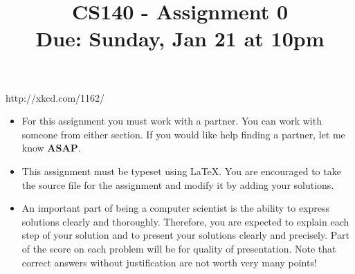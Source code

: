 \documentclass[11pt]{article}
\title{CS140 - Assignment 0\\\small{Due: Sunday,  Jan 21 at 10pm}}
\author{}
\date{}
\begin{document}
\maketitle

\begin{center}

\footnotesize{http://xkcd.com/1162/}
\end{center}


\begin{itemize}
\item For this assignment you must work with a partner.   You can work with someone from either section.  If you would like help finding a partner, let me know \textbf{ASAP}.

\item This assignment must be typeset using \LaTeX.  You are
  encouraged to take the source file for the assignment and modify it by adding your solutions.  
  
\item An important part of being a computer scientist is the ability
  to express solutions clearly and thoroughly.  Therefore, you are
  expected to explain each step of your solution and to present your
  solutions clearly and precisely.  Part of the score on each problem
  will be for quality of presentation.  Note that correct answers
  without justification are not worth very many points!
\end{itemize}

\vspace*{.1cm}
\end{document}
